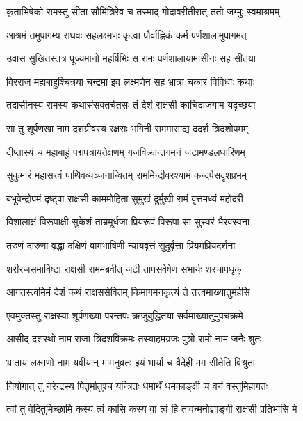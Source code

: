 
\twolineshloka
{कृताभिषेको रामस्तु सीता सौमित्रिरेव च}
{तस्माद् गोदावरीतीरात् ततो जग्मुः स्वमाश्रमम्} %

\twolineshloka
{आश्रमं तमुपागम्य राघवः सहलक्ष्मणः}
{कृत्वा पौर्वाह्णिकं कर्म पर्णशालामुपागमत्} %

\twolineshloka
{उवास सुखितस्तत्र पूज्यमानो महर्षिभिः}
{स रामः पर्णशालायामासीनः सह सीतया} %

\twolineshloka
{विरराज महाबाहुश्चित्रया चन्द्रमा इव}
{लक्ष्मणेन सह भ्रात्रा चकार विविधाः कथाः} %

\twolineshloka
{तदासीनस्य रामस्य कथासंसक्तचेतसः}
{तं देशं राक्षसी काचिदाजगाम यदृच्छया} %

\twolineshloka
{सा तु शूर्पणखा नाम दशग्रीवस्य रक्षसः}
{भगिनी राममासाद्य ददर्श त्रिदशोपमम्} %

\twolineshloka
{दीप्तास्यं च महाबाहुं पद्मपत्रायतेक्षणम्}
{गजविक्रान्तगमनं जटामण्डलधारिणम्} %

\twolineshloka
{सुकुमारं महासत्त्वं पार्थिवव्यञ्जनान्वितम्}
{राममिन्दीवरश्यामं कन्दर्पसदृशप्रभम्} %

\twolineshloka
{बभूवेन्द्रोपमं दृष्ट्वा राक्षसी काममोहिता}
{सुमुखं दुर्मुखी रामं वृत्तमध्यं महोदरी} %

\twolineshloka
{विशालाक्षं विरूपाक्षी सुकेशं ताम्रमूर्धजा}
{प्रियरूपं विरूपा सा सुस्वरं भैरवस्वना} %

\twolineshloka
{तरुणं दारुणा वृद्धा दक्षिणं वामभाषिणी}
{न्यायवृत्तं सुदुर्वृत्ता प्रियमप्रियदर्शना} %

\twolineshloka
{शरीरजसमाविष्टा राक्षसी राममब्रवीत्}
{जटी तापसवेषेण सभार्यः शरचापधृक्} %

\twolineshloka
{आगतस्त्वमिमं देशं कथं राक्षससेवितम्}
{किमागमनकृत्यं ते तत्त्वमाख्यातुमर्हसि} %

\twolineshloka
{एवमुक्तस्तु राक्षस्या शूर्पणख्या परन्तपः}
{ऋजुबुद्धितया सर्वमाख्यातुमुपचक्रमे} %

\twolineshloka
{आसीद् दशरथो नाम राजा त्रिदशविक्रमः}
{तस्याहमग्रजः पुत्रो रामो नाम जनैः श्रुतः} %

\twolineshloka
{भ्रातायं लक्ष्मणो नाम यवीयान् मामनुव्रतः}
{इयं भार्या च वैदेही मम सीतेति विश्रुता} %

\twolineshloka
{नियोगात् तु नरेन्द्रस्य पितुर्मातुश्च यन्त्रितः}
{धर्मार्थं धर्मकाङ्क्षी च वनं वस्तुमिहागतः} %

\twolineshloka
{त्वां तु वेदितुमिच्छामि कस्य त्वं कासि कस्य वा}
{त्वं हि तावन्मनोज्ञाङ्गी राक्षसी प्रतिभासि मे} %

